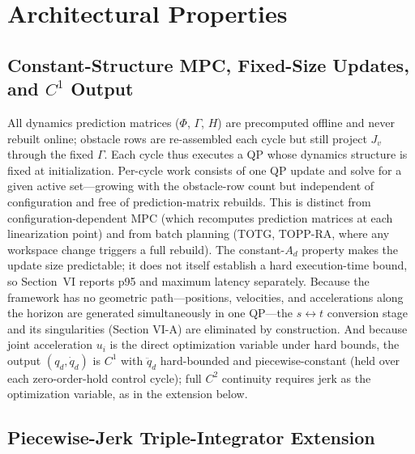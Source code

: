 \section{Architectural Properties}\label{v.-architectural-properties}

\subsection{Constant-Structure MPC, Fixed-Size Updates, and
\texorpdfstring{\(C^1\)}{C1}
Output}\label{a.-constant-structure-mpc-and-bounded-replanning-latency}

All dynamics prediction matrices (\(\Phi\), \(\Gamma\), \(H\)) are
precomputed offline and never rebuilt online; obstacle rows are
re-assembled each cycle but still project \(J_v\) through the fixed
\(\Gamma\). Each cycle thus executes a QP whose dynamics structure is
fixed at initialization. Per-cycle work consists of one QP update and solve
for a given active set---growing with the obstacle-row count but
independent of configuration and free of prediction-matrix rebuilds. This
is distinct from configuration-dependent MPC (which recomputes prediction
matrices at each linearization point) and from batch planning (TOTG,
TOPP-RA, where any workspace change triggers a full rebuild). The
constant-\(A_d\) property makes the update size predictable; it does not
itself establish a hard execution-time bound, so Section~VI reports p95 and
maximum latency separately. Because the framework has no
geometric path---positions, velocities, and accelerations along the
horizon are generated simultaneously in one QP---the \(s\leftrightarrow
t\) conversion stage and its singularities (Section VI-A) are eliminated
by construction. And because joint acceleration \(u_i\) is the direct
optimization variable under hard bounds, the output \((q_d,\dot q_d)\) is
\(C^1\) with \(\ddot q_d\) hard-bounded and piecewise-constant (held over
each zero-order-hold control cycle); full \(C^2\) continuity requires
jerk as the optimization variable, as in the extension below.

\subsection{Piecewise-Jerk Triple-Integrator Extension}\label{d.-piecewise-jerk-triple-integrator-extension-for-continuous-acceleration}

